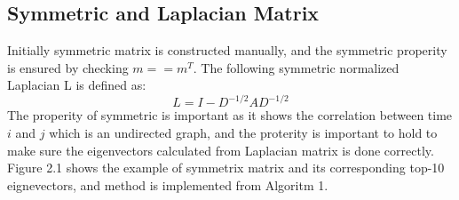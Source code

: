 \documentclass[final]{siamltexmm}
\begin{document}
\subsection{Symmetric and Laplacian Matrix}
Initially symmetric matrix is constructed manually, and the symmetric properity is ensured by checking $m == m^T$. The following symmetric normalized Laplacian L is defined as:
\begin{equation}
L = I - D^{-1/2}AD^{-1/2}
\end{equation}
The properity of symmetric is important as it shows the correlation between time $i$ and $j$ which is an undirected graph, and the proterity is important to hold to make sure the eigenvectors calculated from Laplacian matrix is done correctly. Figure 2.1 shows the example of symmetrix matrix and its corresponding top-10 eignevectors, and method is implemented from Algoritm 1.
\end{document}
